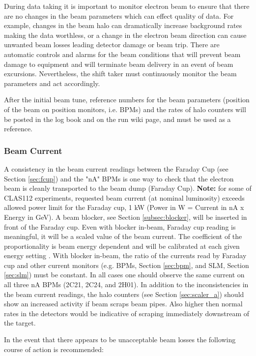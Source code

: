 \documentclass[12pt]{article}
\begin{document}
During data taking it is important to monitor electron beam
to ensure that there are no changes in the beam parameters which can effect quality of data. For
example, changes in the beam halo can dramatically increase background rates
making the data worthless, or a change in the electron beam direction can cause
unwanted beam losses leading detector damage or beam trip. There are
automatic controls and alarms for the beam conditions that will prevent beam damage to equipment 
and will terminate beam delivery in an event of beam excursions. Nevertheless,  the shift taker must
continuously monitor the beam parameters and act accordingly.

After the initial beam tune, reference numbers for the beam parameters (position of the beam on position monitors, i.e. BPMs) and the rates of halo counters will be posted in the log book and on the run wiki page, and must be used as a reference. 

\subsubsection{Beam Current}
\indent

A consistency in the beam current readings between the Faraday Cup (see Section \ref{sec:fcup}) and the "nA" BPMs is one way
to check that the electron beam is cleanly transported to the beam dump (Faraday Cup). {\bf Note:} for some of CLAS112 experiments, requested beam current (at nominal luminosity) exceeds allowed power limit for the Faraday cup, 1 kW (Power in W = Current in nA x Energy in GeV). A beam blocker, see Section \ref{subsec:blocker}, will be inserted in front of the Faraday cup. Even with blocker in-beam, Faraday cup reading is meaningful, it will be a scaled value of the beam current. The coefficient of the proportionality is beam energy dependent \cite{blocker} and will be calibrated at each given energy setting \cite{2018-003}. With blocker in-beam, the ratio of the currents read by Faraday cup and other current monitors (e.g. BPMs, Section \ref{sec:bpm}, and SLM, Section \ref{sec:slm}) must be constant. In all cases one should observe the same current on all three nA BPMs (2C21, 2C24, and 2H01). In addition to the inconsistencies in the beam current readings, the halo counters (see Section \ref{sec:scaler_a}) should
show an increased activity if beam scraps beam pipes. Also higher then normal rates in the detectors would be indicative
of scraping immediately downstream of the target.

In the event that there appears to be unacceptable beam losses the following course of action is recommended:
\end{document}
